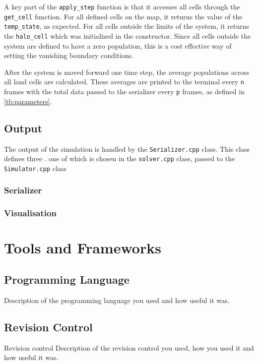 \documentclass[a4paper,11pt]{article}
\begin{document}
A key part of the \texttt{apply\_step} function is that it accesses all cells through the \texttt{get\_cell} function.  For all defined cells on the map, it returns the value of the \texttt{temp\_state}, as expected.  For all cells outside the limits of the system, it returns the \texttt{halo\_cell} which was initialized in the constructor.  Since all cells outside the system are defined to have a zero population, this is a cost effective way of setting the vanishing boundary conditions.

After the system is moved forward one time step, the average populations across all land cells are calculated.  These averages are printed to the terminal every \texttt{n} frames with the total data passed to the serializer every \texttt{p} frames, as defined in \ref{tb:parameters}.

\subsection{Output}\label{output}

The output of the simulation is handled by the \texttt{Serializer.cpp} class.  This class defines three . one of which is chosen in the \texttt{solver.cpp} class, passed to the \texttt{Simulator.cpp} class

\subsubsection{Serializer}

\subsubsection{Visualisation}

\section{Tools and Frameworks}

\subsection{Programming Language}
Description of the programming language you used and how useful it was.

\subsection{Revision Control}
Revision control Description of the revision control you used, how you used it and how useful it was.
\end{document}
